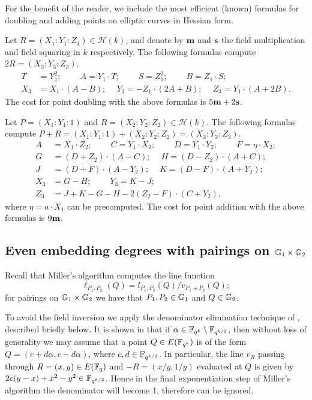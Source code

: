 For the benefit of the reader, we include the most efficient (known) formulas
for doubling and adding points on elliptic curves in Hessian form.

Let $R = (X_1 : Y_1 : Z_1) \in \mathcal{H}(k)$, 
and denote by $\textbf{m}$ and $\textbf{s}$ 
the field multiplication and field squaring in $k$ respectively.
The following formulas compute $2R = (X_3 : Y_3 : Z_3)$.
\begin{align*}
T &= Y_1^2;\	\qquad	A = Y_1 \cdot T;\	\qquad
S = Z_1 ^ 2;\	\qquad	B = Z_1 \cdot S;\\
X_3 &= X_1 \cdot (A - B);\	\quad
Y_3 = -Z_1 \cdot (2A + B);\	\quad
Z_3 = Y_1 \cdot (A + 2B).
\end{align*}
The cost for point doubling with the above formulas is $5\textbf{m} + 2\textbf{s}$. 

Let $P = (X_1 : Y_1 : 1)$ and $R = (X_2 : Y_2 : Z_2) \in \mathcal{H}(k)$.
The following formulas compute
$P + R = (X_1 : Y_1 : 1) + (X_2 : Y_2 : Z_2) = (X_3 : Y_3 : Z_3)$.
\begin{align*}
A &= X_1 \cdot Z_2;\	\qquad
C = Y_1 \cdot X_2;\	\qquad
D = Y_1 \cdot Y_2;\	\qquad
F = \eta \cdot X_2;\\
G &= (D + Z_2) \cdot (A - C);\	\quad
H = (D - Z_2) \cdot (A + C);\\
J &= (D + F) \cdot (A - Y_2);\	\quad
K = (D - F) \cdot (A + Y_2);\\
X_3 &= G - H;\	\qquad
Y_3 = K - J;\\
Z_3 &= J + K - G - H - 2(Z_2 - F) \cdot (C + Y_2),
\end{align*}
where $\eta = a\cdot X_1$ can be precomputed.
The cost for point addition with the above formulas is $9\textbf{m}$.

\subsection{Even embedding degrees with pairings on $\mathbb{G}_{1} \times \mathbb{G}_{2}$}

Recall that Miller's algorithm computes the line function 
$$\ell_{P_1,P_2}(Q) = l_{P_1,P_2}(Q)/v_{P_1 + P_2}(Q);$$
for pairings on $\mathbb{G}_{1} \times \mathbb{G}_{2}$ we have that $P_1, P_2 \in \mathbb{G}_{1}$ and $Q \in \mathbb{G}_{2}$.

To avoid the field inversion we apply the denominator elimination technique of \cite{2010/Gu},
described briefly below. 
It is shown in \cite[Section 4]{2010/Gu} that if
$\alpha \in \mathbb{F}_{q^k} \setminus \mathbb{F}_{q^{k/2}}$, then
without loss of generality we may assume that a point
$Q \in E(\mathbb{F}_{q^k})$ is of the form
$Q = (c+d\alpha, c-d\alpha )$, where
$c, d \in \mathbb{F}_{q^{k/2}}$.
In particular, the line $v_R$ passing through $R = (x,y) \in E(\mathbb{F}_{q})$ 
and $-R = (x/y, 1/y)$ evaluated at $Q$ is given by
$2c(y-x) + x^2-y^2 \in \mathbb{F}_{q^{k/2}}$.
Hence in the final exponentiation step of Miller's algorithm the denominator will become 1,
therefore can be ignored.

